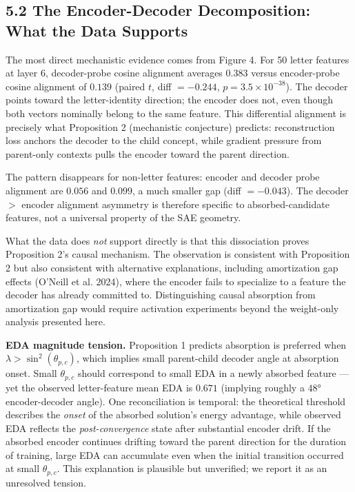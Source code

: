 \documentclass{article}
\begin{document}
\subsection{5.2 The Encoder-Decoder Decomposition: What the Data Supports}

The most direct mechanistic evidence comes from Figure 4. For 50 letter features at layer 6,
decoder-probe cosine alignment averages $0.383$ versus encoder-probe cosine alignment of $0.139$
(paired $t$, diff $= -0.244$, $p = 3.5 \times 10^{-38}$). The decoder points toward the
letter-identity direction; the encoder does not, even though both vectors nominally belong to
the same feature. This differential alignment is precisely what Proposition 2 (mechanistic
conjecture) predicts: reconstruction loss anchors the decoder to the child concept, while
gradient pressure from parent-only contexts pulls the encoder toward the parent direction.

The pattern disappears for non-letter features: encoder and decoder probe alignment are
$0.056$ and $0.099$, a much smaller gap (diff $= -0.043$). The decoder $>$ encoder alignment
asymmetry is therefore specific to absorbed-candidate features, not a universal property of
the SAE geometry.

What the data does \textit{not} support directly is that this dissociation proves Proposition 2's
causal mechanism. The observation is consistent with Proposition 2 but also consistent with
alternative explanations, including amortization gap effects (O'Neill et al. 2024), where the
encoder fails to specialize to a feature the decoder has already committed to. Distinguishing
causal absorption from amortization gap would require activation experiments beyond the
weight-only analysis presented here.

\textbf{EDA magnitude tension.} Proposition 1 predicts absorption is preferred when $\lambda >
\sin^2(\theta_{p,c})$, which implies small parent-child decoder angle at absorption onset.
Small $\theta_{p,c}$ should correspond to small EDA in a newly absorbed feature — yet the
observed letter-feature mean EDA is $0.671$ (implying roughly a $48°$ encoder-decoder angle).
One reconciliation is temporal: the theoretical threshold describes the \textit{onset} of the
absorbed solution's energy advantage, while observed EDA reflects the \textit{post-convergence} state
after substantial encoder drift. If the absorbed encoder continues drifting toward the parent
direction for the duration of training, large EDA can accumulate even when the initial
transition occurred at small $\theta_{p,c}$. This explanation is plausible but unverified;
we report it as an unresolved tension.
\end{document}
